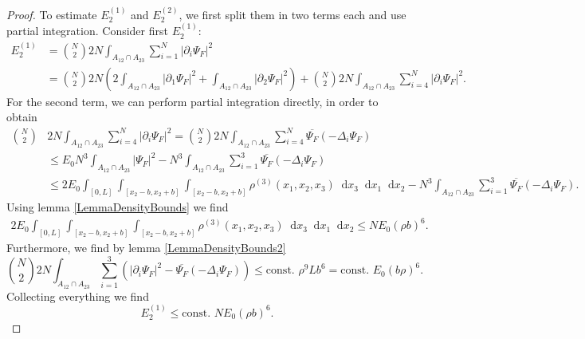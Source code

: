 \documentclass[a4paper,11pt]{article}
\newcommand{\abs}[1]{\left\lvert #1 \right\rvert}
\newcommand*\diff{\mathop{}\!\mathrm{d}}
\numberwithin{equation}{section}
\begin{document}
		\begin{proof}
		To estimate $ E_2^{(1)} $ and $ E_2^{(2)} $, we first split them in two terms each and use partial integration. Consider first $ E_2^{(1)} $: 
		\begin{equation}
		\begin{aligned}
		E_2^{(1)}&=\binom{N}{2}2N\int_{A_{12}\cap A_{23}}\sum_{i=1}^{N}\abs{\partial_i\Psi_F}^2\\
		&=\binom{N}{2}2N\left(2\int_{A_{12}\cap A_{23}}\abs{\partial_1\Psi_F}^2+\int_{A_{12}\cap A_{23}}\abs{\partial_2\Psi_F}^2\right)+\binom{N}{2}2N\int_{A_{12}\cap A_{23}}\sum_{i=4}^{N}\abs{\partial_i\Psi_F}^2.
		\end{aligned}
		\end{equation}
		For the second term, we can perform partial integration directly, in order to obtain \begin{equation}
		\begin{aligned}
		\binom{N}{2}&2N\int_{A_{12}\cap A_{23}}\sum_{i=4}^{N}\abs{\partial_i\Psi_F}^2=\binom{N}{2}2N\int_{A_{12}\cap A_{23}}\sum_{i=4}^{N}\overline{\Psi_F}(-\Delta_i\Psi_F)\\
		&\leq E_0 N^3\int_{A_{12}\cap A_{23}}\abs{\Psi_F}^2-N^3\int_{A_{12}\cap A_{23}}\sum_{i=1}^{3}\overline{\Psi_F}(-\Delta_i\Psi_F)\\&\leq 2E_0\int_{[0,L]}\int_{[x_2-b,x_2+b]}\int_{[x_2-b,x_2+b]}\rho^{(3)}(x_1,x_2,x_3)\diff x_3\diff x_1\diff x_2-N^3\int_{A_{12}\cap A_{23}}\sum_{i=1}^{3}\overline{\Psi_F}(-\Delta_i\Psi_F).
		\end{aligned}
		\end{equation}
		Using lemma \ref{LemmaDensityBounds} we find \begin{equation}
		\begin{aligned}
		2E_0\int_{[0,L]}\int_{[x_2-b,x_2+b]}\int_{[x_2-b,x_2+b]}\rho^{(3)}(x_1,x_2,x_3)\diff x_3\diff x_1\diff x_2\leq NE_0(\rho b)^6.
		\end{aligned}
		\end{equation}
		Furthermore, we find by lemma \ref{LemmaDensityBounds2} \begin{equation}
		\binom{N}{2}2N\int_{A_{12}\cap A_{23}}\sum_{i=1}^{3}\left(\abs{\partial_i\Psi_F}^2-\overline{\Psi_F}(-\Delta_i\Psi_F)\right)\leq \text{const. }\rho^9 L b^6=\text{const. }E_0 (b\rho)^6.
		\end{equation}
		Collecting everything we find \begin{equation}
		E_2^{(1)}\leq \text{const. }NE_0(\rho b)^6.
		\end{equation}

\end{proof}
\end{document}
